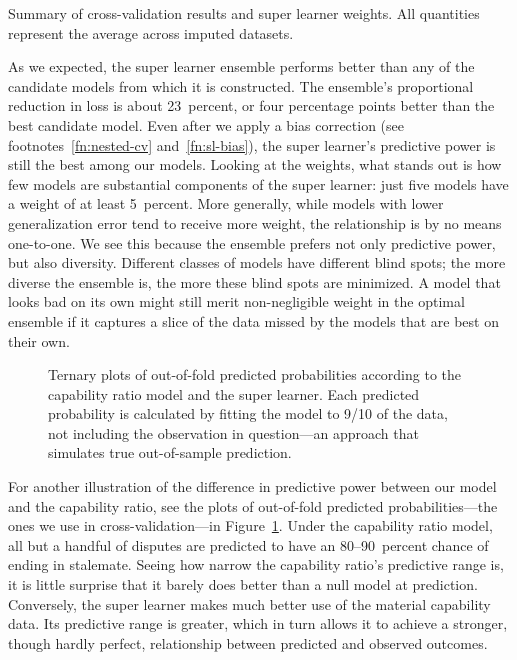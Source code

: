 \begin{table}[tp]
  \centering
  
  \caption{
    Summary of cross-validation results and super learner weights.
    All quantities represent the average across imputed datasets.
  }
  \label{tab:ensemble}
\end{table}

As we expected, the super learner ensemble performs better than any of the candidate models from which it is constructed.
The ensemble's proportional reduction in loss is about 23~percent, or four percentage points better than the best candidate model.
Even after we apply a bias correction (see footnotes~\ref{fn:nested-cv} and~\ref{fn:sl-bias}), the super learner's predictive power is still the best among our models.
Looking at the weights, what stands out is how few models are substantial components of the super learner: just five models have a weight of at least 5~percent.
More generally, while models with lower generalization error tend to receive more weight, the relationship is by no means one-to-one.
We see this because the ensemble prefers not only predictive power, but also diversity.
Different classes of models have different blind spots; the more diverse the ensemble is, the more these blind spots are minimized.
A model that looks bad on its own might still merit non-negligible weight in the optimal ensemble if it captures a slice of the data missed by the models that are best on their own.

\begin{figure}[tp]
  \centering
  
  \vspace{-2em}
  \caption{
    Ternary plots of out-of-fold predicted probabilities according to the capability ratio model and the super learner.
    Each predicted probability is calculated by fitting the model to 9/10 of the data, not including the observation in question---an approach that simulates true out-of-sample prediction.
  }
  \label{fig:oof-pred}
\end{figure}

For another illustration of the difference in predictive power between our model and the capability ratio, see the plots of out-of-fold predicted probabilities---the ones we use in cross-validation---in Figure~\ref{fig:oof-pred}.
Under the capability ratio model, all but a handful of disputes are predicted to have an 80--90~percent chance of ending in stalemate.
Seeing how narrow the capability ratio's predictive range is, it is little surprise that it barely does better than a null model at prediction.
Conversely, the super learner makes much better use of the material capability data.
Its predictive range is greater, which in turn allows it to achieve a stronger, though hardly perfect, relationship between predicted and observed outcomes.

